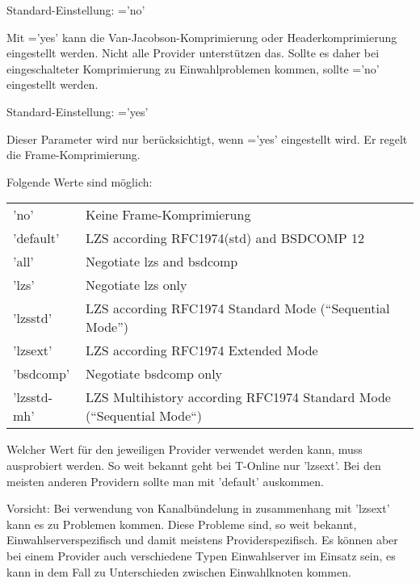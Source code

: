 \begin{description}
  Standard-Einstellung: ='no'

  
  Mit ='yes' kann die
  Van-Jacobson-Komprimierung oder Headerkomprimierung eingestellt
  werden. Nicht alle Provider unterstützen das. Sollte es daher bei
  eingeschalteter Komprimierung zu Einwahlproblemen kommen, sollte
  ='no' eingestellt werden.
  
  Standard-Einstellung: ='yes'


  
  Dieser Parameter wird nur berücksichtigt, wenn ='yes'
  eingestellt wird. Er regelt die Frame-Kom\-pri\-mierung.
  
  Folgende Werte sind möglich:

  \begin{tabular}[h!]{ll}
        'no' &                    Keine Frame-Komprimierung \\
        'default' &               LZS according RFC1974(std) and
        BSDCOMP 12 \\
        'all' &                   Negotiate lzs and bsdcomp \\
        'lzs' &                   Negotiate lzs only \\
        'lzsstd' &                LZS according RFC1974 Standard Mode
                                (``Sequential Mode'') \\
        'lzsext' &                LZS according RFC1974 Extended Mode \\
        'bsdcomp' &               Negotiate bsdcomp only \\
        'lzsstd-mh' &             LZS Multihistory according RFC1974
                                  Standard Mode (``Sequential Mode``)
  \end{tabular}
  
  Welcher Wert für den jeweiligen Provider verwendet werden kann, muss
  ausprobiert werden. So weit bekannt geht bei T-Online nur 'lzsext'.
  Bei den meisten anderen Providern sollte man mit 'default'
  auskommen.
  
  Vorsicht: Bei verwendung von Kanalbündelung in zusammenhang mit
  'lzsext' kann es zu Problemen kommen. Diese Probleme sind, so weit
  bekannt, Einwahlserverspezifisch und damit meistens
  Providerspezifisch. Es können aber bei einem Provider auch
  verschiedene Typen Einwahlserver im Einsatz sein, es kann in dem
  Fall zu Unterschieden zwischen Einwahlknoten kommen.


\end{description}
